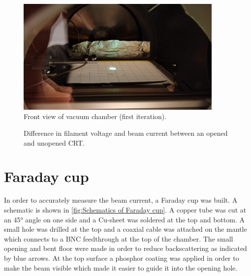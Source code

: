 \begin{figure}[h]
	\centering
	\includegraphics[width=0.9\textwidth]{./Chapters/beam-characterization/center_image}
	\caption{Front view of vacuum chamber (first iteration).}
	\label{fig:Front view of vacuum chamber (first iteration)}
\end{figure}


\begin{figure}[ht]
	\centering
	
	\begin{tikzpicture}
		
	\end{tikzpicture}
	
	\caption{Difference in filament voltage and beam current between an opened and unopened CRT.}
	\label{fig:Difference in filament voltage and beam current between an opened and unopened CRT}
\end{figure}

\section{Faraday cup}
\label{sec:Faraday cup}


In order to accurately measure the beam current, a Faraday cup was built. A schematic is shown in \cref{fig:Schematics of Faraday cup}. A copper tube was cut at an \ang{45} angle on one side and a Cu-sheet was soldered at the top and bottom. A small hole  was drilled at the top and a coaxial cable was attached on the mantle which connects to a BNC feedthrough at the top of the chamber. The small opening and bent floor were made in order to reduce backscattering as indicated by blue arrows. At the top surface a phosphor coating was applied in order to make the beam visible which made it easier to guide it into the opening hole.


